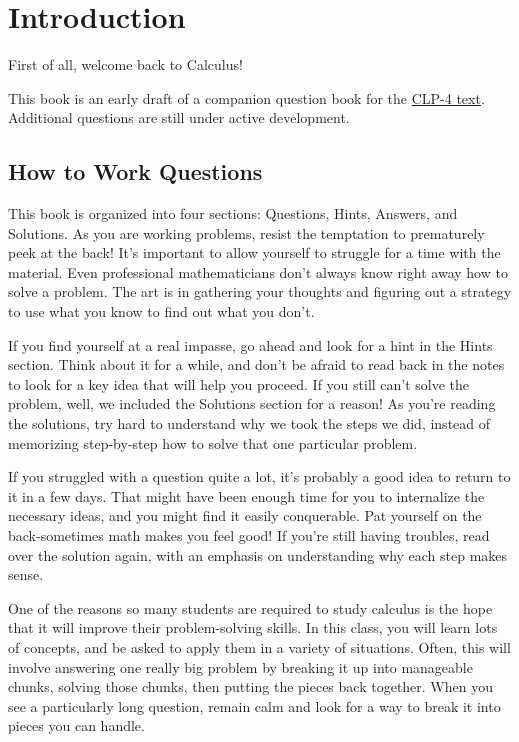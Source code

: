 \section*{Introduction}
First of all, welcome back to Calculus!

This book is an early draft of a companion question book for the \href{http://www.math.ubc.ca/~CLP/CLP4/clp_4_vc.pdf}{CLP-4 text}.
Additional questions are still under active development.

\subsection*{How to Work Questions}

This book is organized into four sections: Questions, Hints, Answers, and Solutions. As you are working problems, resist the temptation to prematurely peek at the back! It's important to allow yourself to struggle for a time with the material. Even professional mathematicians don't always know right away how to solve a problem. The art is in gathering your thoughts and figuring out a strategy to use what you know to find out what you don't.

If you find yourself at a real impasse, go ahead and look for a hint in the Hints section. Think about it for a while, and don't be afraid to read back in the notes to look for a key idea that will help you proceed. If you still can't solve the problem, well, we included the Solutions section for a reason! As you're reading the solutions, try hard to understand why we took the steps we did, instead of memorizing step-by-step how to solve that one particular problem.

If you struggled with a question quite a lot, it's probably a good idea to return to it in a few days. That might have been enough time for you to internalize the necessary ideas, and you might find it easily conquerable. Pat yourself on the back-sometimes math makes you feel good! If you're still having troubles, read over the solution again, with an emphasis on understanding why each step makes sense.

One of the reasons so many students are required to study calculus is the hope that it will improve their problem-solving skills. In this class, you will learn lots of concepts, and be asked to apply them in a variety of situations. Often, this will involve answering one really big problem by breaking it up into manageable chunks, solving those chunks, then putting the pieces back together. When you see a particularly long question, remain calm and look for a way to break it into pieces you can handle.

